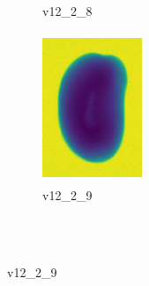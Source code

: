 \documentclass[11pt]{article}
\begin{document}
\begin{figure}
\begin{subfigure}[b]{0.15\textwidth}
        \caption{v12\_2\_8}
         \label{fig:five over x}
     \end{subfigure}
     \hfill
    \begin{subfigure}[b]{0.15\textwidth}
         \centering
         \includegraphics[width=3cm, height=4.5cm]{images/kartofler/v12_2_9_cut.png}
        \caption{v12\_2\_9}
         \label{fig:five over x}
     \end{subfigure} 
     
     
     \\ \\
     

\end{figure}
\end{document}
